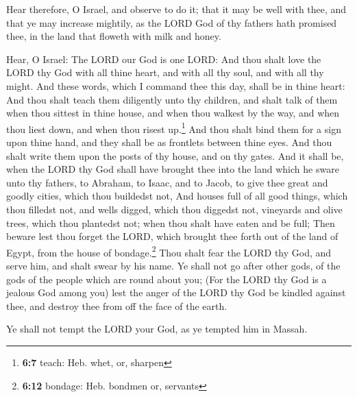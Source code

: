  Hear therefore, O Israel, and observe to do it; that it
may be well with thee, and that ye may increase mightily, as the LORD
God of thy fathers hath promised thee, in the land that floweth with
milk and honey.

 Hear, O Israel: The LORD our God is one LORD:
 And thou shalt love the LORD thy God with all thine
heart, and with all thy soul, and with all thy might.  And
these words, which I command thee this day, shall be in thine heart:
 And thou shalt teach them diligently unto thy children,
and shalt talk of them when thou sittest in thine house, and when thou
walkest by the way, and when thou liest down, and when thou risest
up.\footnote{\textbf{6:7} teach: Heb. whet, or, sharpen} 
And thou shalt bind them for a sign upon thine hand, and they shall be
as frontlets between thine eyes.  And thou shalt write
them upon the posts of thy house, and on thy gates.  And
it shall be, when the LORD thy God shall have brought thee into the land
which he sware unto thy fathers, to Abraham, to Isaac, and to Jacob, to
give thee great and goodly cities, which thou buildedst not,
 And houses full of all good things, which thou filledst
not, and wells digged, which thou diggedst not, vineyards and olive
trees, which thou plantedst not; when thou shalt have eaten and be full;
 Then beware lest thou forget the LORD, which brought
thee forth out of the land of Egypt, from the house of
bondage.\footnote{\textbf{6:12} bondage: Heb. bondmen or, servants}
 Thou shalt fear the LORD thy God, and serve him, and
shalt swear by his name.  Ye shall not go after other
gods, of the gods of the people which are round about you;
 (For the LORD thy God is a jealous God among you) lest
the anger of the LORD thy God be kindled against thee, and destroy thee
from off the face of the earth.

 Ye shall not tempt the LORD your God, as ye tempted him
in Massah.

